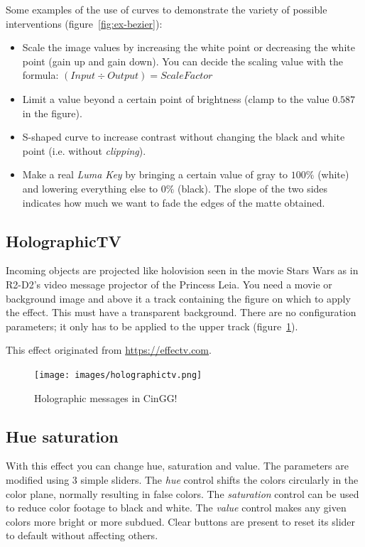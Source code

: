 Some examples of the use of curves to demonstrate the variety of possible interventions (figure~\ref{fig:ex-bezier}):

\begin{itemize}
    \item Scale the image values by increasing the white point or decreasing the white point (gain up and gain down). 
        You can decide the scaling value with the formula: $(Input \div Output) = Scale Factor$
    \item Limit a value beyond a certain point of brightness (clamp to the value $0.587$ in the figure).
    \item S-shaped curve to increase contrast without changing the black and white point (i.e. without \textit{clipping}).
    \item Make a real \textit{Luma Key} by bringing a certain value of gray to $100\%$ (white) and lowering everything else to $0\%$ (black). The slope of the two sides indicates how much we want to fade the edges of the matte obtained.
\end{itemize}

\subsection{HolographicTV}%
\label{sub:holographictv}

Incoming objects are projected like holovision seen in the movie Stars Wars as in R2-D2's video message projector of the Princess Leia. You need a movie or background image and above it a track containing the figure on which to apply the effect. This must have a transparent background. There are no configuration parameters; it only has to be applied to the upper track (figure~\ref{fig:holographictv}). 

This effect originated from {\small \url{https://effectv.com}}.

\begin{figure}[htpb]
    \centering
    \texttt{[image: images/holographictv.png]}
    \caption{Holographic messages in CinGG!}
    \label{fig:holographictv}
\end{figure}

\subsection{Hue saturation}%
\label{sub:hue_saturation}

With this effect you can change hue, saturation and value. The parameters are modified using 3 simple sliders. The \textit{hue} control shifts the colors circularly in the color plane, normally resulting in false colors. The \textit{saturation} control can be used to reduce color footage to black and white. The \textit{value} control makes any given colors more bright or more subdued. Clear buttons are present to reset its slider to default without affecting others.

